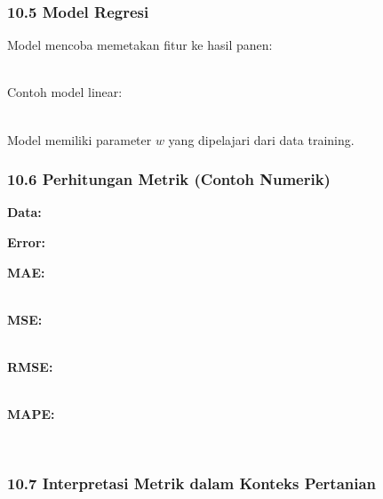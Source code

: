 \documentclass[12pt,a4paper]{article}
\begin{document}
\subsubsection{10.5 Model Regresi}

Model mencoba memetakan fitur ke hasil panen:


\\[
\hat{y} = f(X)
\\]


Contoh model linear:


\\[
\hat{y} = w_1 \cdot \text{curah hujan} + w_2 \cdot \text{suhu} + w_3 \cdot \text{kelembaban tanah} + w_4 \cdot \text{pupuk}
\\]


Model memiliki parameter $w$ yang dipelajari dari data training.


\subsubsection{10.6 Perhitungan Metrik (Contoh Numerik)}

\textbf{Data:}


\textbf{Error:}


\textbf{MAE:}


\\[
\begin{tabular}{|l|l|l|l|l|}
\hline
\text{MAE} = \frac{ & 0.5 & + & 2.0 & }{2} = 1.25 \\
\hline
\end{tabular}
\\]


\textbf{MSE:}


\\[
\text{MSE} = \frac{0.5^2 + 2.0^2}{2} = \frac{0.25 + 4}{2} = 2.125
\\]


\textbf{RMSE:}


\\[
\text{RMSE} = \sqrt{2.125} \approx 1.46
\\]


\textbf{MAPE:}


\\[
\text{MAPE} = \frac{1}{2} \left( \frac{0.5}{6.0} + \frac{2.0}{5.0} \right) \times 100\% \approx 24.2\%
\\]


\subsubsection{10.7 Interpretasi Metrik dalam Konteks Pertanian}
\end{document}
